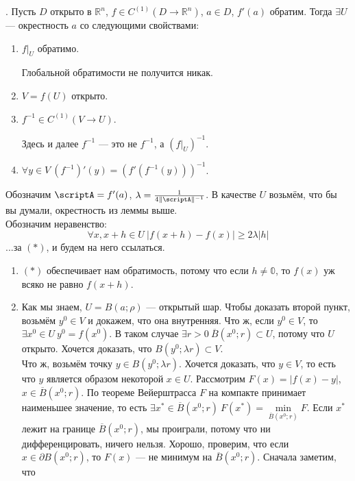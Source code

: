 \documentclass{article}
\begin{document}
\begin{itemize}
\begin{Proof}
$$            $$
        \end{Proof}
        \thm {}. Пусть $D$ открыто в $\mathbb R^n$, $f\in C^{(1)}(D\to\mathbb R^n)$, $a\in D$, $f'(a)$ обратим. Тогда $\exists U$ --- окрестность $a$ со следующими свойствами:
        \begin{enumerate}
            \item $f\Big|_U$ обратимо.
            \begin{Comment}
                Глобальной обратимости не получится никак.
            \end{Comment}
            \item $V=f(U)$ открыто.
            \item $f^{-1}\in C^{(1)}(V\to U)$.
            \begin{Comment}
                Здесь и далее $f^{-1}$ --- это не $f^{-1}$, а $\left(f\Big|_U\right)^{-1}$.
            \end{Comment}
            \item $\forall y\in V~(f^{-1})'(y)=(f'(f^{-1}(y)))^{-1}$.
        \end{enumerate}
        \pagebreak
        \begin{Proof}
            Обозначим $\scriptA=f'(a)$, $\lambda=\frac1{4\|\scriptA\|^{-1}}$. В качестве $U$ возьмём, что бы вы думали, окрестность из леммы выше.\\
            Обозначим неравенство:
            $$
            \forall x,x+h\in U~|f(x+h)-f(x)|\geqslant2\lambda|h|
            $$
            ...за $(*)$, и будем на него ссылаться.
            \begin{enumerate}
                \item $(*)$ обеспечивает нам обратимость, потому что если $h\neq\mathbb0$, то $f(x)$ уж всяко не равно $f(x+h)$.
                \item Как мы знаем, $U=B(a;\rho)$ --- открытый шар. Чтобы доказать второй пункт, возьмём $y^0\in V$ и докажем, что она внутренняя. Что ж, если $y^0\in V$, то $\exists x^0\in U~y^0=f(x^0)$. В таком случае $\exists r>0~\overline B(x^0;r)\subset U$, потому что $U$ открыто. Хочется доказать, что $B(y^0;\lambda r)\subset V$.\\
                Что ж, возьмём точку $y\in B(y^0;\lambda r)$. Хочется доказать, что $y\in V$, то есть что $y$ является образом некоторой $x\in U$. Рассмотрим $F(x)=|f(x)-y|$, $x\in\overline B(x^0;r)$. По теореме Вейерштрасса $F$ на компакте принимает наименьшее значение, то есть $\exists x^*\in\overline B(x^0;r)~F(x^*)=\min\limits_{\overline B(x^0;r)}F$. Если $x^*$ лежит на границе $\overline B(x^0;r)$, мы проиграли, потому что ни дифференцировать, ничего нельзя. Хорошо, проверим, что если $x\in\partial B(x^0;r)$, то $F(x)$ --- не минимум на $\overline B(x^0;r)$. Сначала заметим, что

\end{enumerate}
\end{Proof}
\end{itemize}
\end{document}
